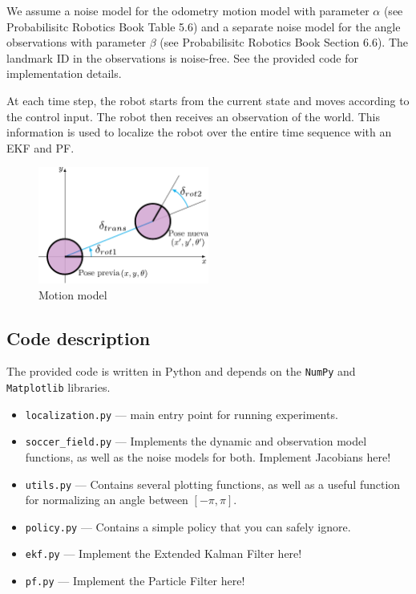 \documentclass[tp]{lcc}
\begin{document}
We assume a noise model for the odometry motion model with parameter $\alpha$ (see Probabilisitc Robotics Book Table 5.6) and a separate noise model for the angle observations with parameter $\beta$ (see Probabilisitc Robotics Book Section 6.6). The landmark ID in the observations is noise-free. See the provided code for implementation details.

At each time step, the robot starts from the current state and moves according to the control input. The robot then receives an observation of the world. This information is used to localize the robot over the entire time sequence with an EKF and PF.

\begin{figure}[!htbp]
\centering
\includegraphics[width=0.5\textwidth]{./images/odometry_as_controls.pdf}
\caption{Motion model}
\label{fig:odometry-base-motion-model}
\end{figure}

\subsection{Code description}

The provided code is written in Python and depends on the \lstinline[style=bash]{NumPy} and \lstinline[style=bash]{Matplotlib} libraries.

\begin{itemize}
\item \lstinline[style=bash]{localization.py} --- main entry point for running experiments.
\item \lstinline[style=bash]{soccer_field.py} --- Implements the dynamic and observation model functions, as well as the noise models for both. Implement Jacobians here!
\item \lstinline[style=bash]{utils.py} --- Contains several plotting functions, as well as a useful function for normalizing an angle between $[-\pi, \pi]$.
\item \lstinline[style=bash]{policy.py} --- Contains a simple policy that you can safely ignore.
\item \lstinline[style=bash]{ekf.py} --- Implement the Extended Kalman Filter here!
\item \lstinline[style=bash]{pf.py} --- Implement the Particle Filter here!
\end{itemize}
\end{document}
